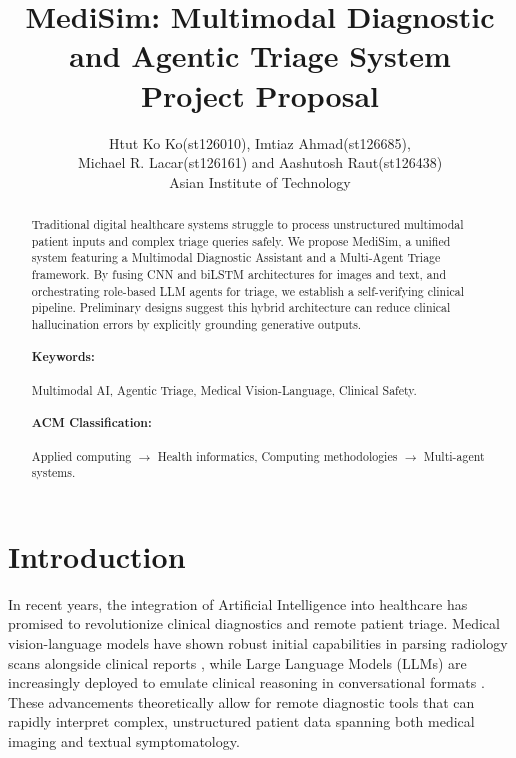 \documentclass[11pt,a4paper]{article}
\title{MediSim: Multimodal Diagnostic and Agentic Triage System\\
Project Proposal}
\author{
  \mdseries Htut Ko Ko(st126010), Imtiaz Ahmad(st126685), \\
  \mdseries Michael R. Lacar(st126161) and Aashutosh Raut(st126438) \\
  \mdseries Asian Institute of Technology
}
\begin{document}
\maketitle

\begin{abstract}
Traditional digital healthcare systems struggle to process unstructured multimodal patient inputs and complex triage queries safely. We propose MediSim, a unified system featuring a Multimodal Diagnostic Assistant and a Multi-Agent Triage framework. By fusing CNN and biLSTM architectures for images and text, and orchestrating role-based LLM agents for triage, we establish a self-verifying clinical pipeline. Preliminary designs suggest this hybrid architecture can reduce clinical hallucination errors by explicitly grounding generative outputs.

\paragraph{Keywords:} Multimodal AI, Agentic Triage, Medical Vision-Language, Clinical Safety.
\paragraph{ACM Classification:} Applied computing $\rightarrow$ Health informatics, Computing methodologies $\rightarrow$ Multi-agent systems.
\end{abstract}

\section{Introduction}

In recent years, the integration of Artificial Intelligence into healthcare has promised to revolutionize clinical diagnostics and remote patient triage. Medical vision-language models have shown robust initial capabilities in parsing radiology scans alongside clinical reports \citep{bu2024dynamic}, while Large Language Models (LLMs) are increasingly deployed to emulate clinical reasoning in conversational formats \citep{lu2024triageagent}. These advancements theoretically allow for remote diagnostic tools that can rapidly interpret complex, unstructured patient data spanning both medical imaging and textual symptomatology.
\end{document}
